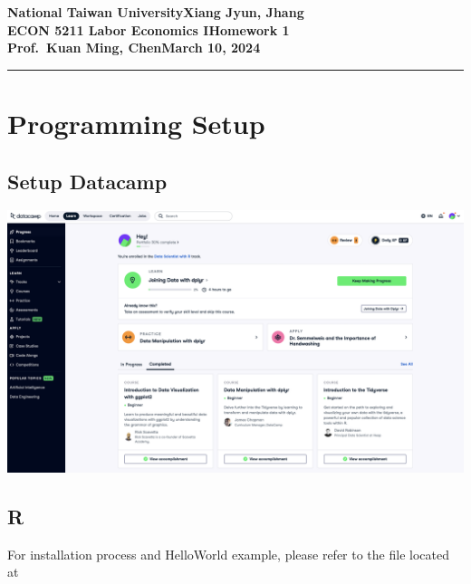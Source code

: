 \documentclass[11pt]{article}
\newcommand{\myname}{Xiang Jyun, Jhang}
\newcommand{\assignment}{Homework 1}
\newcommand{\duedate}{March 10, 2024}
\begin{document}
\textbf{National Taiwan University}\hfill\textbf{\myname}\\[0.01in]
\textbf{ECON 5211 Labor Economics I}\hfill\textbf{\assignment}\\[0.01in]
\textbf{Prof.\ Kuan Ming, Chen}\hfill\textbf{\duedate}\\
\smallskip\hrule\bigskip



\section{Programming Setup}

    \subsection{Setup Datacamp}
        \includegraphics[scale = 0.35]{Q1_1_2_datacamp.png}

    \subsection{R}
        For installation process and HelloWorld example, please refer to the file located at 

\end{document}
